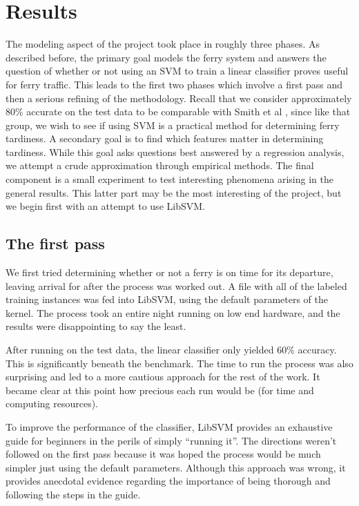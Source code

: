 \documentclass[11pt]{article} %
\begin{document}
\section{Results}
\label{sec:results}
The modeling aspect of the project took place in roughly three phases. As 
described before, the primary goal models the ferry system and answers the 
question of whether or not using an SVM to train a linear classifier proves useful 
for ferry traffic. This leads to the first two phases
which involve a first pass and then a serious refining of the methodology.  Recall 
that we consider approximately $80\%$ accurate on the test data to be comparable
with Smith et al \cite{smith2008decision}, since like that group, we wish to see
if using SVM is a practical method for determining ferry tardiness. 
A secondary goal is to find which features matter in determining tardiness.  While
this goal asks questions best answered by a regression analysis, we 
attempt a crude approximation through empirical methods.  The final component is 
a small experiment to test interesting phenomena arising in the general results.  
This latter part may be the most interesting of the project, but we begin 
first with an attempt to use LibSVM.

\subsection{The first pass}
\label{sec:firstpass}
We first tried determining whether or not a ferry is on
time for its departure, leaving arrival for after the process was worked out. 
A file with all of the labeled training instances was fed into LibSVM, using the
default parameters of the kernel. The process took an entire night running on
low end hardware, and the results were disappointing to say the least.

After running on the test data, the linear classifier only yielded $60\%$ accuracy. 
This is significantly beneath the benchmark. The time to run the process was also
surprising and led to a more cautious approach for the rest of the work. It became
clear at this point how precious each run would be (for time and computing 
resources). 

To 
improve the performance of the classifier, LibSVM provides an exhaustive guide 
\cite{chang2011libsvm} for beginners in the perils of simply ``running it''. The 
directions weren't followed on the first pass because it was hoped the process 
would be much simpler just using the default parameters. Although this approach
was wrong, it provides anecdotal evidence regarding the importance of being 
thorough and following the steps in the guide.
\end{document}
